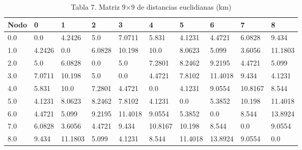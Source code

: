 \begin{table}[htbp]
  \centering
  \caption{Tabla 7. Matriz 9×9 de distancias euclidianas (km)}
  \label{tab:tabla-7-matriz-distancias}
  \begin{tabular}{llllllllll}
    \toprule
    Nodo & 0 & 1 & 2 & 3 & 4 & 5 & 6 & 7 & 8 \\
    \midrule
    0.0 & 0.0 & 4.2426 & 5.0 & 7.0711 & 5.831 & 4.1231 & 4.4721 & 6.0828 & 9.434 \\
    1.0 & 4.2426 & 0.0 & 6.0828 & 10.198 & 10.0 & 8.0623 & 5.099 & 3.6056 & 11.1803 \\
    2.0 & 5.0 & 6.0828 & 0.0 & 5.0 & 7.2801 & 8.2462 & 9.2195 & 4.4721 & 5.099 \\
    3.0 & 7.0711 & 10.198 & 5.0 & 0.0 & 4.4721 & 7.8102 & 11.4018 & 9.434 & 4.1231 \\
    4.0 & 5.831 & 10.0 & 7.2801 & 4.4721 & 0.0 & 4.1231 & 9.0554 & 10.8167 & 8.544 \\
    5.0 & 4.1231 & 8.0623 & 8.2462 & 7.8102 & 4.1231 & 0.0 & 5.3852 & 10.198 & 11.4018 \\
    6.0 & 4.4721 & 5.099 & 9.2195 & 11.4018 & 9.0554 & 5.3852 & 0.0 & 8.544 & 13.8924 \\
    7.0 & 6.0828 & 3.6056 & 4.4721 & 9.434 & 10.8167 & 10.198 & 8.544 & 0.0 & 9.0554 \\
    8.0 & 9.434 & 11.1803 & 5.099 & 4.1231 & 8.544 & 11.4018 & 13.8924 & 9.0554 & 0.0 \\
    \bottomrule
  \end{tabular}
\end{table}
